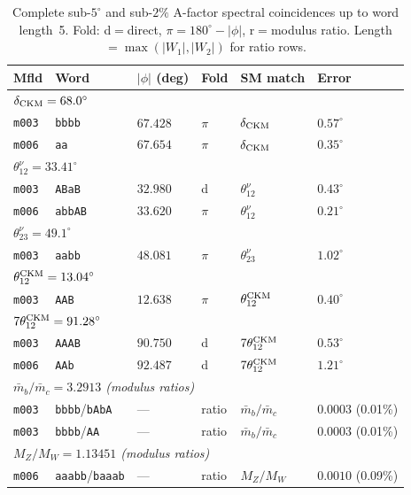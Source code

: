 ﻿\documentclass[aps,prd,twocolumn,longbibliography]{revtex4-2}
\newcommand{\mfld}[1]{\texttt{#1}}
\newcommand{\word}[1]{\texttt{#1}}
\newcommand{\degr}{^{\circ}}
\begin{document}
\begin{table}[tp]
\centering
\caption{Complete sub-$5\degr$ and sub-$2\%$ A-factor spectral coincidences
  up to word length~5. Fold: d$=$direct, $\pi$$=180\degr-|\phi|$,
  r$=$modulus ratio. Length$=\max(|W_1|,|W_2|)$ for ratio rows.}
\label{tab:full}
\small
\begin{tabular}{llllll}
\toprule
Mfld & Word & $|\phi|$ (deg) & Fold & SM match & Error \\
\midrule
\multicolumn{6}{l}{\textit{$\delta_{\rm CKM}=68.0\degr$}}\\
\mfld{m003} & \word{bbbb} & $67.428$ & $\pi$ & $\delta_{\rm CKM}$ & $0.57\degr$ \\
\mfld{m006} & \word{aa} & $67.654$ & $\pi$ & $\delta_{\rm CKM}$ & $0.35\degr$ \\
\midrule
\multicolumn{6}{l}{\textit{$\theta_{12}^\nu=33.41\degr$}}\\
\mfld{m003} & \word{ABaB} & $32.980$ & d & $\theta_{12}^\nu$ & $0.43\degr$ \\
\mfld{m006} & \word{abbAB} & $33.620$ & $\pi$ & $\theta_{12}^\nu$ & $0.21\degr$ \\
\midrule
\multicolumn{6}{l}{\textit{$\theta_{23}^\nu=49.1\degr$}}\\
\mfld{m003} & \word{aabb} & $48.081$ & $\pi$ & $\theta_{23}^\nu$ & $1.02\degr$ \\
\midrule
\multicolumn{6}{l}{\textit{$\theta_{12}^{\rm CKM}=13.04\degr$}}\\
\mfld{m003} & \word{AAB} & $12.638$ & $\pi$ & $\theta_{12}^{\rm CKM}$ & $0.40\degr$ \\
\midrule
\multicolumn{6}{l}{\textit{$7\theta_{12}^{\rm CKM}=91.28\degr$}}\\
\mfld{m003} & \word{AAAB} & $90.750$ & d & $7\theta_{12}^{\rm CKM}$ & $0.53\degr$ \\
\mfld{m006} & \word{AAb} & $92.487$ & d & $7\theta_{12}^{\rm CKM}$ & $1.21\degr$ \\
\midrule
\multicolumn{6}{l}{\textit{$\bar{m}_b/\bar{m}_c=3.2913$ (modulus ratios)}}\\
\mfld{m003} & \word{bbbb}/\word{bAbA} & --- & ratio & $\bar{m}_b/\bar{m}_c$ & $0.0003$ (0.01\%) \\
\mfld{m003} & \word{bbbb}/\word{AA} & --- & ratio & $\bar{m}_b/\bar{m}_c$ & $0.0003$ (0.01\%) \\
\midrule
\multicolumn{6}{l}{\textit{$M_Z/M_W=1.13451$ (modulus ratios)}}\\
\mfld{m006} & \word{aaabb}/\word{baaab} & --- & ratio & $M_Z/M_W$ & $0.0010$ (0.09\%) \\
\bottomrule
\end{tabular}
\end{table}
\end{document}
